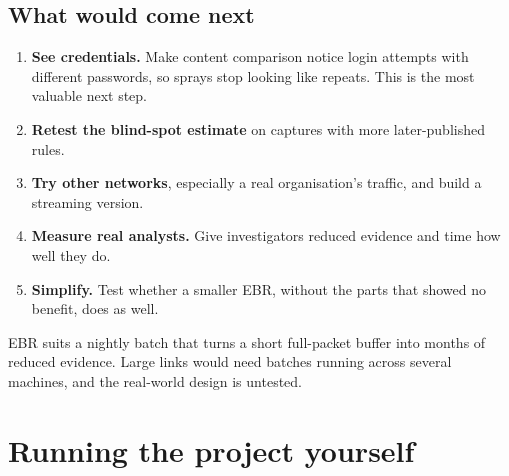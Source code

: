 \section{What would come next}
\begin{enumerate}
\item \textbf{See credentials.} Make content comparison notice login attempts with different passwords, so sprays stop looking like repeats. This is the most valuable next step.
\item \textbf{Retest the blind-spot estimate} on captures with more later-published rules.
\item \textbf{Try other networks}, especially a real organisation's traffic, and build a streaming version.
\item \textbf{Measure real analysts.} Give investigators reduced evidence and time how well they do.
\item \textbf{Simplify.} Test whether a smaller EBR, without the parts that showed no benefit, does as well.
\end{enumerate}

\begin{recap}
EBR suits a nightly batch that turns a short full-packet buffer into months of reduced evidence. Large links would need batches running across several machines, and the real-world design is untested.
\end{recap}

\chapter{Running the project yourself}
\label{ch:run}

